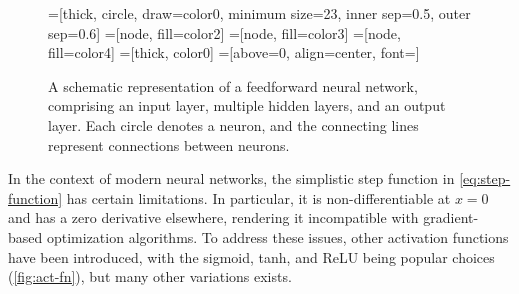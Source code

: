 \begin{figure}[tb]
        =[thick, circle, draw=color0, minimum size=23, 
                          inner sep=0.5, outer sep=0.6]
     =[node, fill=color2]
 =[node, fill=color3]
    =[node, fill=color4]
     =[thick, color0]
       =[above=0, align=center, font=\sffamily]
\def\nstyle{int(\lay<\Nnodlen?min(2,\lay):3)} %
\centering
{}
\caption[Schematic of a Feedforward Neural Network]{
    A schematic representation of a feedforward neural network, 
    comprising an input layer, multiple hidden layers, and an output layer. 
    Each circle denotes a neuron, and the connecting lines represent 
    connections between neurons.}
\label{fig:nn-structure}
\end{figure}

In the context of modern neural networks, 
the simplistic step function in \cref{eq:step-function} 
has certain limitations.
In particular, it is non-differentiable at \(x = 0\) and
has a zero derivative elsewhere, 
rendering it incompatible with gradient-based optimization algorithms.  
To address these issues, other activation functions
have been introduced,
with the sigmoid, \ac{tanh}, and \ac{ReLU} being popular choices 
(\cref{fig:act-fn}), but many other variations exists.
~\autocite{cholletDeep2021}


